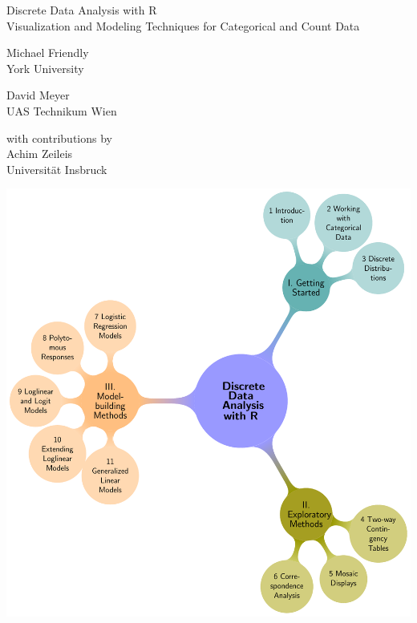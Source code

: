 \setcounter{page}{1}
\bigskip
\begin{center}
\sffamily
\Huge{Discrete Data Analysis with R} \\
\LARGE{Visualization and Modeling Techniques for Categorical and Count Data}
\end{center}
\bigskip
\bigskip

  \begin{minipage}[c]{.5\textwidth}
  	\begin{center}
   	{\Large Michael Friendly} \\ York University
   	\end{center}
   \end{minipage}%
  \hfill
  \begin{minipage}[c]{.5\textwidth}
		\begin{center}  
		{\Large David Meyer} \\ UAS Technikum Wien
   	\end{center}
  \end{minipage}

\bigskip
\begin{center}
with contributions by \\ {\Large Achim Zeileis} \\ Universit\"at Insbruck
\end{center}

\bigskip
\bigskip
\bigskip
\begin{center}
	\includegraphics[width=.95\textwidth]{front/fig/tocmap}
\end{center}


